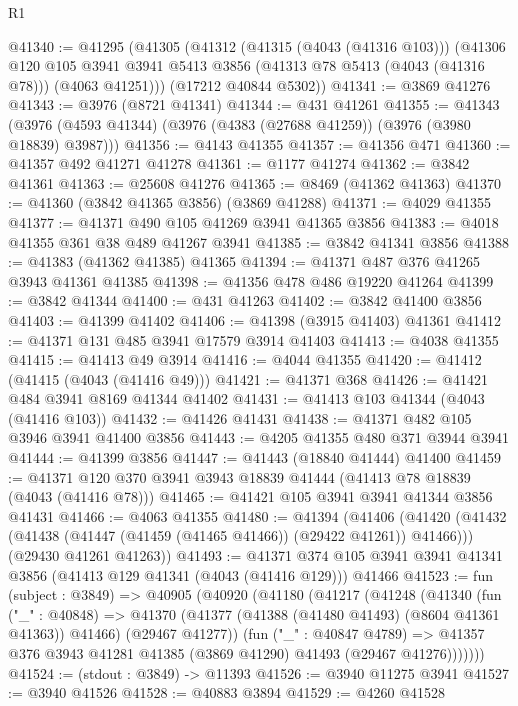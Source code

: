 \begin{lexlean}{R1}
\begin{coremodule}
@41340 := @41295
    (@41305
      (@41312
        (@41315 (@4043 (@41316 @103)))
        (@41306
          @120
          @105
          @3941
          @3941
          @5413
          @3856
          (@41313 @78 @5413 (@4043 (@41316 @78)))
          (@4063 @41251)))
      (@17212 @40844 @5302))
@41341 := @3869 @41276
@41343 := @3976 (@8721 @41341)
@41344 := @431 @41261
@41355 := @41343 (@3976 (@4593 @41344) (@3976 (@4383 (@27688 @41259)) (@3976 (@3980 @18839) @3987)))
@41356 := @4143 @41355
@41357 := @41356 @471
@41360 := @41357 @492 @41271 @41278
@41361 := @1177 @41274
@41362 := @3842 @41361
@41363 := @25608 @41276
@41365 := @8469 (@41362 @41363)
@41370 := @41360 (@3842 @41365 @3856) (@3869 @41288)
@41371 := @4029 @41355
@41377 := @41371 @490 @105 @41269 @3941 @41365 @3856
@41383 := @4018 @41355 @361 @38 @489 @41267 @3941
@41385 := @3842 @41341 @3856
@41388 := @41383 (@41362 @41385) @41365
@41394 := @41371 @487 @376 @41265 @3943 @41361 @41385
@41398 := @41356 @478 @486 @19220 @41264
@41399 := @3842 @41344
@41400 := @431 @41263
@41402 := @3842 @41400 @3856
@41403 := @41399 @41402
@41406 := @41398 (@3915 @41403) @41361
@41412 := @41371 @131 @485 @3941 @17579 @3914 @41403
@41413 := @4038 @41355
@41415 := @41413 @49 @3914
@41416 := @4044 @41355
@41420 := @41412 (@41415 (@4043 (@41416 @49)))
@41421 := @41371 @368
@41426 := @41421 @484 @3941 @8169 @41344 @41402
@41431 := @41413 @103 @41344 (@4043 (@41416 @103))
@41432 := @41426 @41431
@41438 := @41371 @482 @105 @3946 @3941 @41400 @3856
@41443 := @4205 @41355 @480 @371 @3944 @3941
@41444 := @41399 @3856
@41447 := @41443 (@18840 @41444) @41400
@41459 := @41371 @120 @370 @3941 @3943 @18839 @41444 (@41413 @78 @18839 (@4043 (@41416 @78)))
@41465 := @41421 @105 @3941 @3941 @41344 @3856 @41431
@41466 := @4063 @41355
@41480 := @41394
    (@41406
      (@41420 (@41432 (@41438 (@41447 (@41459 (@41465 @41466)) (@29422 @41261)) @41466)))
      (@29430 @41261 @41263))
@41493 := @41371
    @374
    @105
    @3941
    @3941
    @41341
    @3856
    (@41413 @129 @41341 (@4043 (@41416 @129)))
    @41466
@41523 := fun (subject : @3849) =>
  @40905
    (@40920
      (@41180
        (@41217
          (@41248
            (@41340
              (fun ("_" : @40848) =>
              @41370 (@41377 (@41388 (@41480 @41493) (@8604 @41361 @41363)) @41466) (@29467 @41277))
              (fun ("_" : @40847 @4789) =>
              @41357 @376 @3943 @41281 @41385 (@3869 @41290) @41493 (@29467 @41276)))))))
@41524 := (stdout : @3849) -> @11393
@41526 := @3940 @11275 @3941
@41527 := @3940 @41526
@41528 := @40883 @3894
@41529 := @4260 @41528

\end{coremodule}
\end{lexlean}
